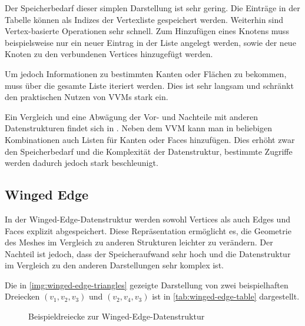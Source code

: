 Der Speicherbedarf dieser simplen Darstellung ist sehr gering.
Die Einträge in der Tabelle können als Indizes der Vertexliste gespeichert werden.
Weiterhin sind Vertex-basierte Operationen sehr schnell.
Zum Hinzufügen eines Knotens muss beispielsweise nur ein neuer Eintrag in der Liste angelegt werden, sowie der neue Knoten zu den verbundenen Vertices hinzugefügt werden.

Um jedoch Informationen zu bestimmten Kanten oder Flächen zu bekommen, muss über die gesamte Liste iteriert werden.
Dies ist sehr langsam und schränkt den praktischen Nutzen von \acp{VVM} stark ein.

Ein Vergleich und eine Abwägung der Vor- und Nachteile mit anderen Datenstrukturen findet sich in \cite[Kap. 11]{smith2006vertex}.
Neben dem \ac{VVM} kann man in beliebigen Kombinationen auch Listen für Kanten oder Faces hinzufügen.
Dies erhöht zwar den Speicherbedarf und die Komplexität der Datenstruktur, bestimmte Zugriffe werden dadurch jedoch stark beschleunigt.


\subsection{Winged Edge}
\label{subsec:winged-edge}

In der Winged-Edge-Datenstruktur \cite{baumgart1975polyhedron} werden sowohl Vertices als auch Edges und Faces explizit abgespeichert.
Diese Repräsentation ermöglicht es, die Geometrie des Meshes im Vergleich zu anderen Strukturen leichter zu verändern.
Der Nachteil ist jedoch, dass der Speicheraufwand sehr hoch und die Datenstruktur im Vergleich zu den anderen Darstellungen sehr komplex ist.

Die in \autoref{img:winged-edge-triangles} gezeigte Darstellung von zwei beispielhaften Dreiecken $(v_1, v_2, v_3)$ und $(v_2, v_4, v_3)$ ist in \autoref{tab:winged-edge-table} dargestellt.

\begin{figure}[ht]
\centering
{}
\caption{Beispieldreiecke zur Winged-Edge-Datenstruktur}
\label{img:winged-edge-triangles}
\end{figure}

